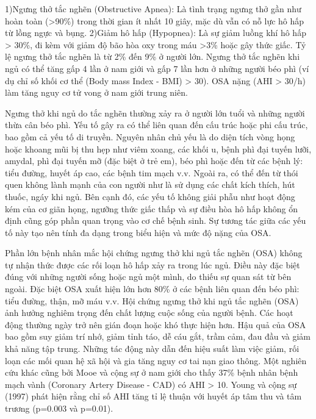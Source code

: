 1)Ngưng thở tắc nghẽn (Obstructive Apnea): Là tình trạng ngưng thở gần như hoàn toàn (>90\%) trong thời gian ít nhất 10 giây, mặc dù vẫn có nỗ lực hô hấp từ lồng ngực và bụng. 2)Giảm hô hấp (Hypopnea): Là sự giảm luồng khí hô hấp > 30\%, đi kèm với giảm độ bão hòa oxy trong máu >3\% hoặc gây thức giấc. Tỷ lệ ngưng thở tắc nghẽn là từ 2\% đến 9\% ở người lớn. Ngưng thở tắc nghẽn khi ngủ có thể tăng gấp 4 lần ở nam giới và gấp 7 lần hơn ở những người béo phì (ví dụ chỉ số khối cơ thể (Body mass Index - BMI) > 30). OSA nặng (AHI > 30/h) làm tăng nguy cơ tử vong ở nam giới trung niên.

Ngưng thở khi ngủ do tắc nghẽn thường xảy ra ở người lớn tuổi và những người thừa cân béo phì. Yếu tố gây ra có thể liên quan đến cấu trúc hoặc phi cấu trúc, bao gồm cả yếu tố di truyền. Nguyên nhân chủ yếu là do diện tích vòng họng hoặc khoang mũi bị thu hẹp như viêm xoang, các khối u, bệnh phì đại tuyến lưỡi, amydal, phì đại tuyến mỡ (đặc biệt ở trẻ em), béo phì hoặc đến từ các bệnh lý: tiểu đường, huyết áp cao, các bệnh tim mạch v.v\cite{wright1997health}. Ngoài ra, có thể đến từ thói quen không lành mạnh của con người như là sử dụng các chất kích thích, hút thuốc, ngáy khi ngủ\cite{reason_osa}\cite{reasonOsa}. Bên cạnh đó, các yếu tố không giải phẫu như hoạt động kém của cơ giãn họng, ngưỡng thức giấc thấp và sự điều hòa hô hấp không ổn định cũng góp phần quan trọng vào cơ chế bệnh sinh. Sự tương tác giữa các yếu tố này tạo nên tính đa dạng trong biểu hiện và mức độ nặng của OSA.



Phần lớn bệnh nhân mắc hội chứng ngưng thở khi ngủ tắc nghẽn (\gls{OSA}) không tự nhận thức được các rối loạn hô hấp xảy ra trong lúc ngủ. Điều này đặc biệt đúng với những người sống hoặc ngủ một mình, do thiếu sự quan sát từ bên ngoài. Đặc biệt OSA xuất hiện lớn hơn 80\% ở các bệnh liên quan đến béo phì: tiểu đường, thận, mỡ máu v.v\cite{wright1997health}. Hội chứng ngưng thở khi ngủ tắc nghẽn (OSA) ảnh hưởng nghiêm trọng đến chất lượng cuộc sống của người bệnh. Các hoạt động thường ngày trở nên gián đoạn hoặc khó thực hiện hơn. Hậu quả của OSA bao gồm suy giảm trí nhớ, giảm tỉnh táo, dễ cáu gắt, trầm cảm, đau đầu và giảm khả năng tập trung\cite{flemons1997quality}. Những tác động này dẫn đến hiệu suất làm việc giảm, rối loạn các mối quan hệ xã hội và gia tăng nguy cơ tai nạn giao thông. Một nghiên cứu khác cũng bởi Mooe và cộng sự\cite{mooe1996sleep} ở nam giới cho thấy 37\% bệnh nhân bệnh mạch vành (Coronary Artery Disease - CAD) có AHI > 10. Young và cộng sự (1997) phát hiện rằng chỉ số AHI tăng tỉ lệ thuận với huyết áp tâm thu và tâm trương (p=0.003 và p=0.01)\cite{young1997population}.

